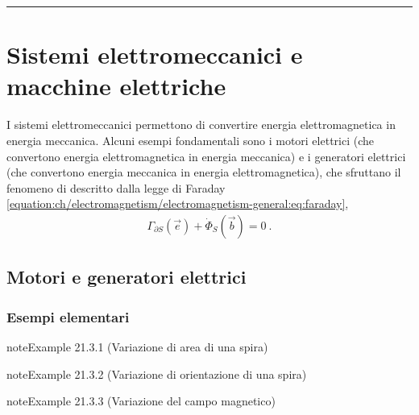 \documentclass[letterpaper,10pt,italian]{jupyterBook}
\begin{document}
\bigskip\hrule\bigskip


\sphinxstepscope


\section{Sistemi elettromeccanici e macchine elettriche}
\label{\detokenize{ch/electromagnetism/electric-machines:sistemi-elettromeccanici-e-macchine-elettriche}}\label{\detokenize{ch/electromagnetism/electric-machines:physics-hs-electromagnetism-electric-machines}}\label{\detokenize{ch/electromagnetism/electric-machines::doc}}
\sphinxAtStartPar
I sistemi elettromeccanici permettono di convertire energia elettromagnetica in energia meccanica. Alcuni esempi fondamentali sono i motori elettrici (che convertono energia elettromagnetica in energia meccanica) e i generatori elettrici (che convertono energia meccanica in energia elettromagnetica), che sfruttano il fenomeno di {\hyperref[\detokenize{ch/electromagnetism/electromagnetism-general:physics-hs-electromagnetism-electromagnetism-general-em-induction}]{}} descritto dalla legge di Faraday \eqref{equation:ch/electromagnetism/electromagnetism-general:eq:faraday},
\begin{equation*}
\begin{split}\Gamma_{\partial S}(\vec{e}) + \dot{\Phi}_{S}(\vec{b}) = 0 \ .\end{split}
\end{equation*}

\subsection{Motori e generatori elettrici}
\label{\detokenize{ch/electromagnetism/electric-machines:motori-e-generatori-elettrici}}\label{\detokenize{ch/electromagnetism/electric-machines:physics-hs-electromagnetism-electric-machines-motor}}

\subsubsection{Esempi elementari}
\label{\detokenize{ch/electromagnetism/electric-machines:esempi-elementari}}\label{ch/electromagnetism/electric-machines:example-0}
\begin{sphinxadmonition}{note}{Example 21.3.1 (Variazione di area di una spira)}


\end{sphinxadmonition}
\label{ch/electromagnetism/electric-machines:example-1}
\begin{sphinxadmonition}{note}{Example 21.3.2 (Variazione di orientazione di una spira)}


\end{sphinxadmonition}
\label{ch/electromagnetism/electric-machines:example-2}
\begin{sphinxadmonition}{note}{Example 21.3.3 (Variazione del campo magnetico)}


\end{sphinxadmonition}
\end{document}
